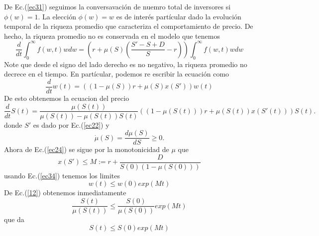 \documentclass[12pt,a4paper]{article}
\begin{document}
\quad De Ec.(\ref{ec31}) seguimos la conversavación de nuemro total de inversores si $\phi(w)=1$. La elección $\phi(w)=w$ es de interés partícular dado la evolución temporal de la riqueza promedio que caracteriza el comportamiento de precio. De hecho, la riqueza promedio no es conservada en el modelo que tenemos
\begin{equation}
\frac{d}{dt}\int^{\infty}_{0}f(w,t)wdw=\left(r+\mu(S)\left(\frac{S'-S+D}{S}-r\right)\right)\int^{\infty}_{0}f(w,t)wdw\label{ec33}
\end{equation}
Note que desde el signo del lado derecho es no negativo, la riqueza promedio no decrece en el tiempo. En partícular, podemos re escribir la ecuación como
\begin{equation}
\frac{d}{dt}w(t)=((1-\mu(S))r+ \mu(S)x(S'))w(t) \label{ec34}
\end{equation}
De esto obtenemos la ecuacion del precio
\begin{equation}
\frac{d}{dt}S(t)=\frac{\mu(S(t))}{\mu(S(t))-\mu(S(t))S(t)}((1-\mu(S(t)))r+\mu(S(t))x(S'(t)))S(t).
\end{equation}
donde $S'$ es dado por Ec.(\ref{ec22}) y
\begin{equation}
\dot{\mu}(S)=\frac{d\mu(S)}{dS}\geq 0. 
\end{equation}
Ahora de Ec.(\ref{ec24}) se sigue por la monotonicidad de $\mu$ que
$$
x(S')\leq M:= r+\frac{D}{S(0)(1-\mu(S(0)))}
$$
usando Ec.(\ref{ec34}) tenemos los limites
\begin{equation}
w(t)\leq w(0)exp(Mt)\label{ec36}
\end{equation}
De Ec.(\ref{12}) obtenemos inmediatamente
$$
\frac{S(t)}{\mu(S(t))}\leq \frac{S(0)}{\mu(S(0))}exp(Mt)
$$
que da
\begin{equation}
S(t)\leq S(0)exp(Mt) \label{ec37}
\end{equation}
\end{document}
